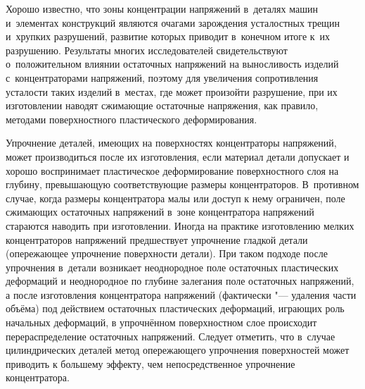 

\date{18/I/2012}


\maketitle




Хорошо известно, что зоны концентрации напряжений в~деталях машин и~элементах конструкций являются очагами зарождения усталостных трещин и~хрупких разрушений, развитие которых приводит в~конечном итоге к~их разрушению.
Результаты многих исследователей  свидетельствуют о~положительном влиянии остаточных напряжений на выносливость изделий с~концентраторами напряжений, поэтому для увеличения сопротивления усталости таких изделий в~местах, где может произойти разрушение, при их изготовлении наводят сжимающие остаточные напряжения, как правило, методами поверхностного пластического деформирования. 



Упрочнение деталей, имеющих на поверхностях концентраторы напряжений, может производиться после их изготовления, если материал  детали допускает и хорошо воспринимает пластическое деформирование поверхностного слоя на глубину, превышающую соответствующие размеры концентраторов. 
В~противном случае, когда размеры концентратора малы или доступ к нему ограничен,  поле сжимающих остаточных напряжений в~зоне концентратора напряжений стараются наводить при изготовлении.
Иногда на практике изготовлению мелких концентраторов напряжений предшествует упрочнение гладкой детали (опережающее упрочнение поверхности детали).
При таком подходе после упрочнения в~детали возникает неоднородное поле остаточных пластических деформаций и неоднородное по глубине залегания поле остаточных напряжений, а после изготовления концентратора напряжений (фактически "--- удаления части объёма) под действием остаточных пластических деформаций, играющих роль начальных деформаций, в упрочнённом поверхностном слое происходит  перераспределение остаточных напряжений.
Следует отметить, что в~случае цилиндрических деталей метод опережающего упрочнения поверхностей может приводить к большему эффекту, чем непосредственное упрочнение концентратора.

